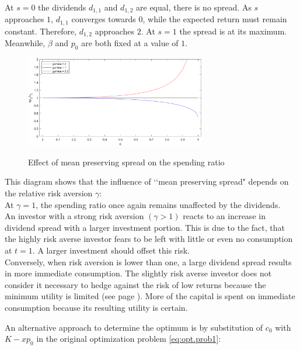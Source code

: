 \bigskip

\noindent At $s=0$ the dividends $d_{1,1}$ and $d_{1,2}$ are equal, there is no spread. As $s$ approaches $1$, $d_{1,1}$ converges towards $0$, while the expected return must remain constant. Therefore, $d_{1,2}$ approaches $2$. At $s=1$ the spread is at its maximum. Meanwhile, $\beta$ and $p_0$ are both fixed at a value of $1$.\\


\begin{figure}[h!]
    \centering
    \includegraphics[width=0.7\textwidth]{files/matlab - mean preserving spread s.png}\label{fig:s-dividends-spread}
    \caption{Effect of mean preserving spread on the spending ratio}
\end{figure}

\bigskip

\noindent This diagram shows that the influence of \lq\lq mean preserving spread" depends on the relative risk aversion $\gamma$:\\
At $\gamma = 1$, the spending ratio once again remains unaffected by the dividends.\\
An investor with a strong risk aversion $(\gamma>1)$ reacts to an increase in dividend spread with a larger investment portion. This is due to the fact, that the highly risk averse investor fears to be left with little or even no consumption at $t=1$. A larger investment should offset this risk.\\
Conversely, when risk aversion is lower than one, a large dividend spread results in more immediate consumption. The slightly risk averse investor does not consider it necessary to hedge against the risk of low returns because the minimum utility is limited (see page \pageref{isoel.ut.f:limits}). More of the capital is spent on immediate consumption because its resulting utility is certain.


\vspace{10mm}

\noindent An alternative approach to determine the optimum is by substitution of $c_0$ with $K-xp_0$ in the original optimization problem \eqref{eq:opt.prob1}:

